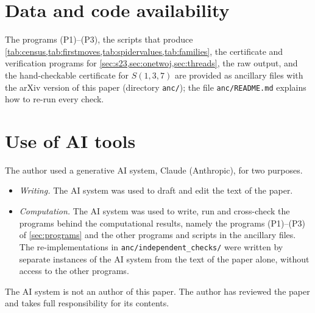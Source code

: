 \documentclass[11pt]{amsart}
\theoremstyle{definition}
\theoremstyle{remark}
\newcommand{\Sp}{S}
\begin{document}
\section*{Data and code availability}
The programs (P1)--(P3), the scripts that produce \cref{tab:census,tab:firstmoves,tab:spidervalues,tab:families}, the certificate and verification programs for \cref{sec:s23,sec:onetwoj,sec:threads}, the raw output, and the hand-checkable certificate for $\Sp(1,3,7)$ are provided as ancillary files with the arXiv version of this paper (directory \texttt{anc/}); the file \texttt{anc/README.md} explains how to re-run every check.

\section*{Use of AI tools}
The author used a generative AI system, Claude (Anthropic), for two purposes.
\begin{itemize}[leftmargin=*]
\item \emph{Writing.} The AI system was used to draft and edit the text of the paper.
\item \emph{Computation.} The AI system was used to write, run and cross-check the programs behind the computational results, namely the programs (P1)--(P3) of \cref{sec:programs} and the other programs and scripts in the ancillary files. The re-implementations in \texttt{anc/independent\_checks/} were written by separate instances of the AI system from the text of the paper alone, without access to the other programs.
\end{itemize}
The AI system is not an author of this paper. The author has reviewed the paper and takes full responsibility for its contents.
\end{document}
